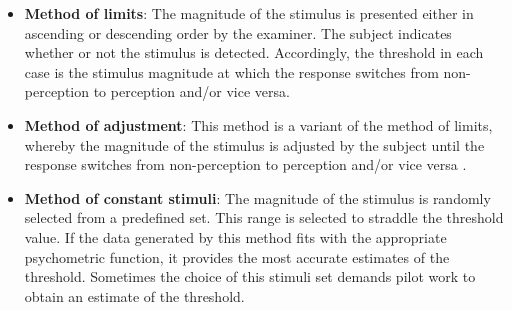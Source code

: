 \begin{itemize}

	\item \textbf{Method of limits}: The magnitude of the stimulus is presented either in ascending or descending order by the examiner. The subject indicates whether or not the stimulus is detected. Accordingly, the threshold in each case is the stimulus magnitude at which the response switches from non-perception to perception and/or vice versa. \cite{Kingdom2016}
	\item \textbf{Method of adjustment}: This method is a variant of the method of limits, whereby the magnitude of the stimulus is adjusted by the subject until the response switches from non-perception to perception and/or vice versa \cite{Kingdom2016}. %
	\item \textbf{Method of constant stimuli}: The magnitude of the stimulus is randomly selected from a predefined set. This range is selected to straddle the threshold value. If the data generated by this method fits with the appropriate psychometric function, it provides the most accurate estimates of the threshold. Sometimes the  choice of this stimuli set demands pilot work to obtain an estimate of the threshold. \cite{Kingdom2016}
\end{itemize}
